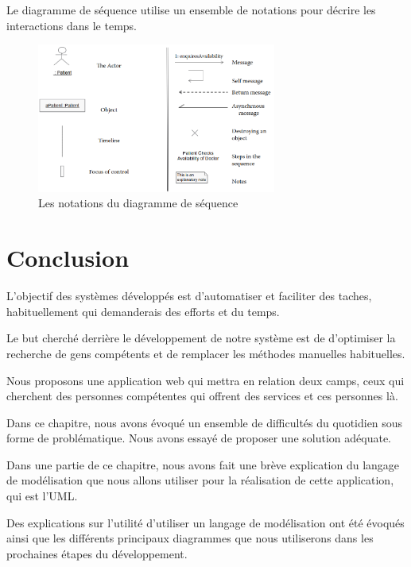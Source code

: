 \documentclass[french]{report}
\begin{document}
\begin{description}
                Le diagramme de séquence utilise un ensemble de notations pour décrire les interactions dans le temps.
                \begin{figure}[H] 
                    \center 
                    \includegraphics[width=0.7\textwidth,keepaspectratio]{images/diag sequence component.png} 
                    \caption{Les notations du diagramme de séquence}
                    \label{Sequence diag notations}
                \end{figure}
            \end{description}

\section{Conclusion}
L'objectif des systèmes développés est d'automatiser et faciliter des taches, habituellement 
qui demanderais des efforts et du temps.

Le but cherché derrière le développement de notre système est de d'optimiser la recherche
de gens compétents et de remplacer les méthodes manuelles habituelles.

Nous proposons une application web qui mettra en relation deux camps, ceux qui cherchent
des personnes compétentes qui offrent des services et ces personnes là.

Dans ce chapitre, nous avons évoqué un ensemble de difficultés du quotidien sous forme 
de problématique. Nous avons essayé de proposer une solution adéquate.

Dans une partie de ce chapitre, nous avons fait une brève explication du langage de 
modélisation que nous allons utiliser pour la réalisation de cette application, qui est l'UML.

Des explications sur l'utilité d'utiliser un langage de modélisation ont été évoqués ainsi
que les différents principaux diagrammes que nous utiliserons dans les prochaines étapes du développement.
\end{document}
